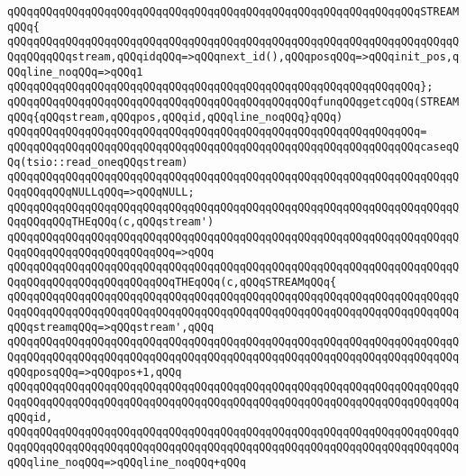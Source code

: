 \verb|qQQqqQQqqQQqqQQqqQQqqQQqqQQqqQQqqQQqqQQqqQQqqQQqqQQqqQQqqQQqqQQqSTREAMqQQq{|\newline
\verb|qQQqqQQqqQQqqQQqqQQqqQQqqQQqqQQqqQQqqQQqqQQqqQQqqQQqqQQqqQQqqQQqqQQqqQQqqQQqqQQqstream,qQQqidqQQq=>qQQqnext_id(),qQQqposqQQq=>qQQqinit_pos,qQQqline_noqQQq=>qQQq1|\newline
\verb|qQQqqQQqqQQqqQQqqQQqqQQqqQQqqQQqqQQqqQQqqQQqqQQqqQQqqQQqqQQqqQQq};|\newline
\newline
\verb|qQQqqQQqqQQqqQQqqQQqqQQqqQQqqQQqqQQqqQQqqQQqqQQqfunqQQqgetcqQQq(STREAMqQQq{qQQqstream,qQQqpos,qQQqid,qQQqline_noqQQq}qQQq)|\newline
\verb|qQQqqQQqqQQqqQQqqQQqqQQqqQQqqQQqqQQqqQQqqQQqqQQqqQQqqQQqqQQqqQQq=|\newline
\verb|qQQqqQQqqQQqqQQqqQQqqQQqqQQqqQQqqQQqqQQqqQQqqQQqqQQqqQQqqQQqqQQqcaseqQQq(tsio::read_oneqQQqstream)|\newline
\newline
\verb|qQQqqQQqqQQqqQQqqQQqqQQqqQQqqQQqqQQqqQQqqQQqqQQqqQQqqQQqqQQqqQQqqQQqqQQqqQQqqQQqNULLqQQq=>qQQqNULL;|\newline
\newline
\verb|qQQqqQQqqQQqqQQqqQQqqQQqqQQqqQQqqQQqqQQqqQQqqQQqqQQqqQQqqQQqqQQqqQQqqQQqqQQqqQQqTHEqQQq(c,qQQqstream')|\newline
\verb|qQQqqQQqqQQqqQQqqQQqqQQqqQQqqQQqqQQqqQQqqQQqqQQqqQQqqQQqqQQqqQQqqQQqqQQqqQQqqQQqqQQqqQQqqQQqqQQq=>qQQq|\newline
\verb|qQQqqQQqqQQqqQQqqQQqqQQqqQQqqQQqqQQqqQQqqQQqqQQqqQQqqQQqqQQqqQQqqQQqqQQqqQQqqQQqqQQqqQQqqQQqqQQqTHEqQQq(c,qQQqSTREAMqQQq{|\newline
\verb|qQQqqQQqqQQqqQQqqQQqqQQqqQQqqQQqqQQqqQQqqQQqqQQqqQQqqQQqqQQqqQQqqQQqqQQqqQQqqQQqqQQqqQQqqQQqqQQqqQQqqQQqqQQqqQQqqQQqqQQqqQQqqQQqqQQqqQQqqQQqqQQqstreamqQQq=>qQQqstream',qQQq|\newline
\verb|qQQqqQQqqQQqqQQqqQQqqQQqqQQqqQQqqQQqqQQqqQQqqQQqqQQqqQQqqQQqqQQqqQQqqQQqqQQqqQQqqQQqqQQqqQQqqQQqqQQqqQQqqQQqqQQqqQQqqQQqqQQqqQQqqQQqqQQqqQQqqQQqposqQQq=>qQQqpos+1,qQQq|\newline
\verb|qQQqqQQqqQQqqQQqqQQqqQQqqQQqqQQqqQQqqQQqqQQqqQQqqQQqqQQqqQQqqQQqqQQqqQQqqQQqqQQqqQQqqQQqqQQqqQQqqQQqqQQqqQQqqQQqqQQqqQQqqQQqqQQqqQQqqQQqqQQqqQQqid,|\newline
\verb|qQQqqQQqqQQqqQQqqQQqqQQqqQQqqQQqqQQqqQQqqQQqqQQqqQQqqQQqqQQqqQQqqQQqqQQqqQQqqQQqqQQqqQQqqQQqqQQqqQQqqQQqqQQqqQQqqQQqqQQqqQQqqQQqqQQqqQQqqQQqqQQqline_noqQQq=>qQQqline_noqQQq+qQQq|\newline

